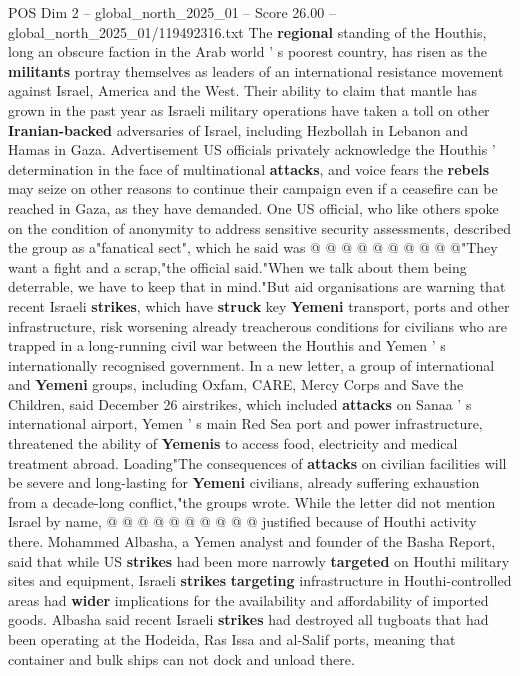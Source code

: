 \begin{textsample}{POS Dim 2 – global\_north\_2025\_01 – Score 26.00 – global\_north\_2025\_01/119492316.txt}
The \textbf{regional} standing of the Houthis, long an obscure faction in the Arab world ' s poorest country, has risen as the \textbf{militants} portray themselves as leaders of an international resistance movement against Israel, America and the West.
Their ability to claim that mantle has grown in the past year as Israeli military operations have taken a toll on other \textbf{Iranian-backed} adversaries of Israel, including Hezbollah in Lebanon and Hamas in Gaza.
Advertisement US officials privately acknowledge the Houthis ' determination in the face of multinational \textbf{attacks}, and voice fears the \textbf{rebels} may seize on other reasons to continue their campaign even if a ceasefire can be reached in Gaza, as they have demanded.
One US official, who like others spoke on the condition of anonymity to address sensitive security assessments, described the group as a"fanatical sect", which he said was @ @ @ @ @ @ @ @ @ @"They want a fight and a scrap,"the official said."When we talk about them being deterrable, we have to keep that in mind."But aid organisations are warning that recent Israeli \textbf{strikes}, which have \textbf{struck} key \textbf{Yemeni} transport, ports and other infrastructure, risk worsening already treacherous conditions for civilians who are trapped in a long-running civil war between the Houthis and Yemen ' s internationally recognised government.
In a new letter, a group of international and \textbf{Yemeni} groups, including Oxfam, CARE, Mercy Corps and Save the Children, said December 26 airstrikes, which included \textbf{attacks} on Sanaa ' s international airport, Yemen ' s main Red Sea port and power infrastructure, threatened the ability of \textbf{Yemenis} to access food, electricity and medical treatment abroad.
Loading"The consequences of \textbf{attacks} on civilian facilities will be severe and long-lasting for \textbf{Yemeni} civilians, already suffering exhaustion from a decade-long conflict,"the groups wrote.
While the letter did not mention Israel by name, @ @ @ @ @ @ @ @ @ @ justified because of Houthi activity there.
Mohammed Albasha, a Yemen analyst and founder of the Basha Report, said that while US \textbf{strikes} had been more narrowly \textbf{targeted} on Houthi military sites and equipment, Israeli \textbf{strikes} \textbf{targeting} infrastructure in Houthi-controlled areas had \textbf{wider} implications for the availability and affordability of imported goods.
Albasha said recent Israeli \textbf{strikes} had destroyed all tugboats that had been operating at the Hodeida, Ras Issa and al-Salif ports, meaning that container and bulk ships can not dock and unload there.

\end{textsample}
